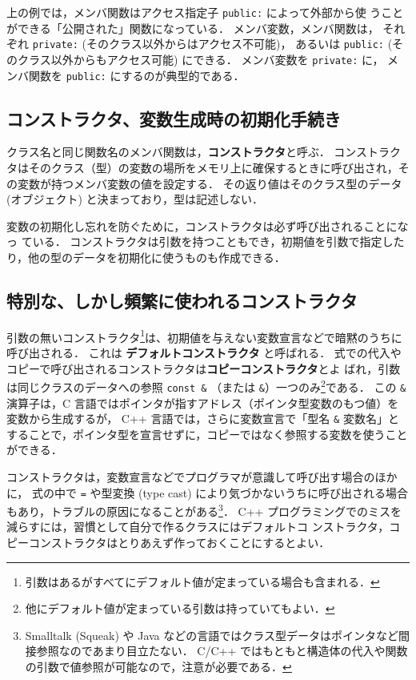 \documentclass[11pt,a4,epsf]{jarticle}
\begin{document}
上の例では，メンバ関数はアクセス指定子 \verb+public:+ によって外部から使
うことができる「公開された」関数になっている．
メンバ変数，メンバ関数は，
それぞれ \verb+private:+ (そのクラス以外からはアクセス不可能)，
あるいは \verb+public:+ (そのクラス以外からもアクセス可能) にできる．
メンバ変数を \verb+private:+ に，
メンバ関数を \verb+public:+ にするのが典型的である．


\subsection{コンストラクタ、変数生成時の初期化手続き}

クラス名と同じ関数名のメンバ関数は，{\bf コンストラクタ}と呼ぶ．
コンストラクタはそのクラス（型）の変数の場所をメモリ上に確保するときに呼び出され，その変数が持つメンバ変数の値を設定する．
その返り値はそのクラス型のデータ (オブジェクト) と決まっており，型は記述しない．

変数の初期化し忘れを防ぐために，コンストラクタは必ず呼び出されることになっ
ている．
コンストラクタは引数を持つこともでき，初期値を引数で指定したり，他の型のデータを初期化に使うものも作成できる．

\subsection{特別な、しかし頻繁に使われるコンストラクタ}
引数の無いコンストラクタ\footnote{引数はあるがすべてにデフォルト値が定まっている場合も含まれる．}は、初期値を与えない変数宣言などで暗黙のうちに呼び出される．
これは {\bf デフォルトコンストラクタ} と呼ばれる．
式での代入やコピーで呼び出されるコンストラクタは{\bf コピーコンストラクタ}とよ
ばれ，引数は同じクラスのデータへの参照 \verb+const &+ （または \verb+&+）一つのみ\footnote{他にデフォルト値が定まっている引数は持っていてもよい．}である．
この \verb+&+ 演算子は，C 言語ではポインタが指すアドレス（ポインタ型変数のもつ値）を変数から生成するが，
C++ 言語では，さらに変数宣言で「型名 \verb+&+ 変数名」とすることで，ポインタ型を宣言せずに，コピーではなく参照する変数を使うことができる．

コンストラクタは，変数宣言などでプログラマが意識して呼び出す場合のほかに，
式の中で \verb+=+ や型変換 (type cast) により気づかないうちに呼び出される場合もあり，トラブルの原因になることがある\footnote{Smalltalk (Squeak) や Java などの言語ではクラス型データはポインタなど間接参照なのであまり目立たない．
C/C++ ではもともと構造体の代入や関数の引数で値参照が可能なので，注意が必要である．}．
C++ プログラミングでのミスを減らすには，習慣として自分で作るクラスにはデフォルトコ
ンストラクタ，コピーコンストラクタはとりあえず作っておくことにするとよい．
\end{document}
